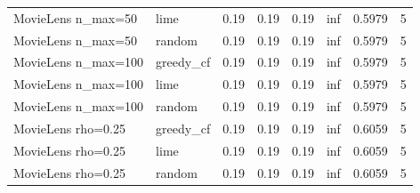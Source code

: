 \begin{table}[t]
{\begin{tabular}{llrrrrrr}
MovieLens n\_max=50 & lime & 0.19 & 0.19 & 0.19 & inf & 0.5979 & 5 \\
MovieLens n\_max=50 & random & 0.19 & 0.19 & 0.19 & inf & 0.5979 & 5 \\
MovieLens n\_max=100 & greedy\_cf & 0.19 & 0.19 & 0.19 & inf & 0.5979 & 5 \\
MovieLens n\_max=100 & lime & 0.19 & 0.19 & 0.19 & inf & 0.5979 & 5 \\
MovieLens n\_max=100 & random & 0.19 & 0.19 & 0.19 & inf & 0.5979 & 5 \\
MovieLens rho=0.25 & greedy\_cf & 0.19 & 0.19 & 0.19 & inf & 0.6059 & 5 \\
MovieLens rho=0.25 & lime & 0.19 & 0.19 & 0.19 & inf & 0.6059 & 5 \\
MovieLens rho=0.25 & random & 0.19 & 0.19 & 0.19 & inf & 0.6059 & 5 \\
\bottomrule
\end{tabular}
}
\end{table}
